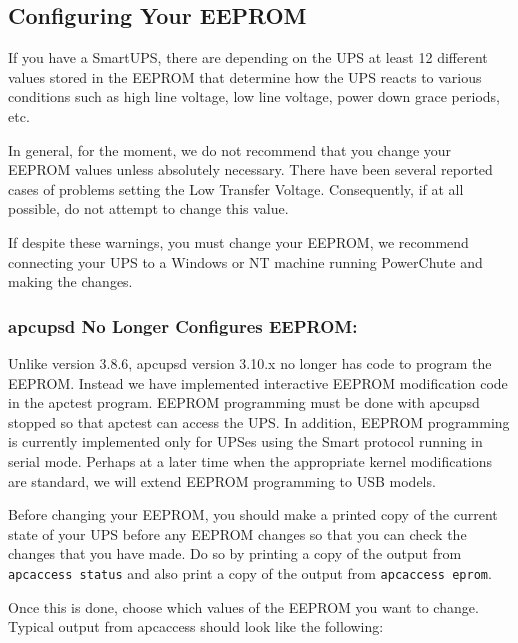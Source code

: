 {{{{{{\subsection*{Configuring Your EEPROM}

\label{index-eeprom_002c-configuring-140}
\label{index-Configuring_002c-eeprom-141}
If you have a SmartUPS, there are depending on the UPS at least 12 different
values stored in the EEPROM that determine how the UPS reacts to various
conditions such as high line voltage, low line voltage, power down grace
periods, etc.  

In general, for the moment, we do not recommend that you change your EEPROM
values unless absolutely necessary. There have been several reported cases of
problems setting the Low Transfer Voltage. Consequently, if at all possible,
do not attempt to change this value.  

If despite these warnings, you must change your EEPROM, we recommend
connecting your UPS to a Windows or NT machine running PowerChute and making
the changes. 

\label{apcupsd-No-Longer-Configures-EEPROM}

\subsubsection*{apcupsd No Longer Configures EEPROM:}

Unlike version 3.8.6, apcupsd version 3.10.x no longer has code to program the
EEPROM. Instead we have implemented interactive EEPROM modification code in
the apctest program. EEPROM programming must be done with apcupsd stopped so
that apctest can access the UPS. In addition, EEPROM programming is currently
implemented only for UPSes using the Smart protocol running in serial mode.
Perhaps at a later time when the appropriate kernel modifications are
standard, we will extend EEPROM programming to USB models.  

Before changing your EEPROM, you should make a printed copy of the current
state of your UPS before any EEPROM changes so that you can check the changes
that you have made. Do so by printing a copy of the output from {\tt apcaccess
status} and also print a copy of the output from {\tt apcaccess eprom}.  

Once this is done, choose which values of the EEPROM you want to change.
Typical output from apcaccess should look like the following: 

}}}}}}
